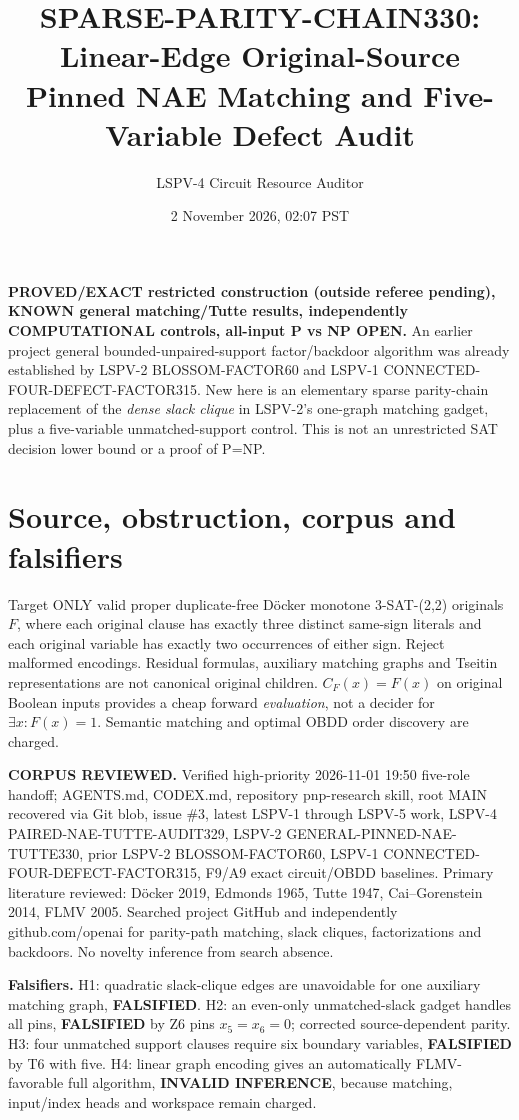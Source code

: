 \documentclass[11pt]{article}
\title{SPARSE-PARITY-CHAIN330: Linear-Edge Original-Source Pinned NAE Matching and Five-Variable Defect Audit}
\author{LSPV-4 Circuit Resource Auditor}
\date{2 November 2026, 02:07 PST}
\begin{document}
\maketitle
\noindent\textbf{PROVED/EXACT restricted construction (outside referee pending), KNOWN general matching/Tutte results, independently COMPUTATIONAL controls, all-input P vs NP OPEN.} An earlier project general bounded-unpaired-support factor/backdoor algorithm was already established by LSPV-2 BLOSSOM-FACTOR60 and LSPV-1 CONNECTED-FOUR-DEFECT-FACTOR315. New here is an elementary sparse parity-chain replacement of the \emph{dense slack clique} in LSPV-2's one-graph matching gadget, plus a five-variable unmatched-support control. This is not an unrestricted SAT decision lower bound or a proof of P=NP.

\section{Source, obstruction, corpus and falsifiers}
Target ONLY valid proper duplicate-free D\"ocker monotone 3-SAT-(2,2) originals $F$, where each original clause has exactly three distinct same-sign literals and each original variable has exactly two occurrences of either sign. Reject malformed encodings. Residual formulas, auxiliary matching graphs and Tseitin representations are not canonical original children. $C_F(x)=F(x)$ on original Boolean inputs provides a cheap forward \emph{evaluation}, not a decider for $\exists x:F(x)=1$. Semantic matching and optimal OBDD order discovery are charged.

\noindent\textbf{CORPUS REVIEWED.} Verified high-priority 2026-11-01 19:50 five-role handoff; AGENTS.md, CODEX.md, repository pnp-research skill, root MAIN recovered via Git blob, issue \#3, latest LSPV-1 through LSPV-5 work, LSPV-4 PAIRED-NAE-TUTTE-AUDIT329, LSPV-2 GENERAL-PINNED-NAE-TUTTE330, prior LSPV-2 BLOSSOM-FACTOR60, LSPV-1 CONNECTED-FOUR-DEFECT-FACTOR315, F9/A9 exact circuit/OBDD baselines. Primary literature reviewed: D\"ocker 2019, Edmonds 1965, Tutte 1947, Cai--Gorenstein 2014, FLMV 2005. Searched project GitHub and independently github.com/openai for parity-path matching, slack cliques, factorizations and backdoors. No novelty inference from search absence.

\noindent\textbf{Falsifiers.} H1: quadratic slack-clique edges are unavoidable for one auxiliary matching graph, \textbf{FALSIFIED}. H2: an even-only unmatched-slack gadget handles all pins, \textbf{FALSIFIED} by Z6 pins $x_5=x_6=0$; corrected source-dependent parity. H3: four unmatched support clauses require six boundary variables, \textbf{FALSIFIED} by T6 with five. H4: linear graph encoding gives an automatically FLMV-favorable full algorithm, \textbf{INVALID INFERENCE}, because matching, input/index heads and workspace remain charged.
\end{document}
